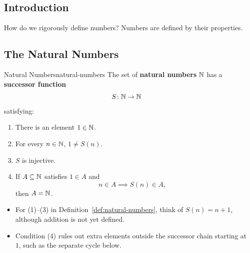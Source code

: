 \subsection{Introduction}

\begin{center}
\end{center}

How do we rigorously define numbers? Numbers are defined by their properties.

\subsection{The Natural Numbers}

\begin{definition}{Natural Numbers}{natural-numbers}
  The set of \textbf{natural numbers} $\mathbb{N}$ has a \textbf{successor function}
  \[
    S\colon\mathbb{N}\to\mathbb{N}
  \]
  satisfying:
  \begin{enumerate}[label=(\arabic*)]
    \item There is an element $1\in\mathbb{N}$.
    \item For every $n\in\mathbb{N}$, $1\ne S(n)$.
    \item $S$ is injective.
    \item If $A\subseteq\mathbb{N}$ satisfies $1\in A$ and
          \[
            n\in A\implies S(n)\in A,
          \]
          then $A=\mathbb{N}$.
  \end{enumerate}
\end{definition}

\begin{thinking}
  \begin{itemize}
    \item For (1)--(3) in Definition~\ref{def:natural-numbers}, think of $S(n)=n+1$, although addition is not yet defined.
    \item Condition (4) rules out extra elements outside the successor chain starting at $1$, such as the separate cycle below.
  \end{itemize}

  \begin{center}
  \end{center}
\end{thinking}

